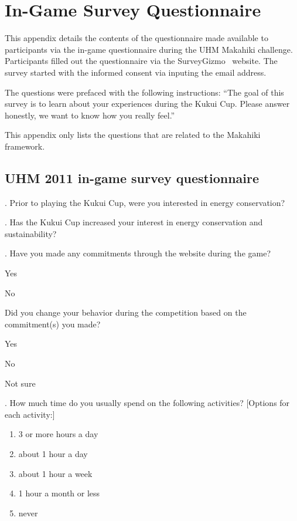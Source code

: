 \chapter{In-Game Survey Questionnaire}
\label{app:in-game-questionnaire}

This appendix details the contents of the questionnaire made available to participants via the in-game questionnaire during the UHM Makahiki challenge. Participants filled out the questionnaire via the SurveyGizmo~\cite{surveygizmo} website. The survey started with the informed consent via inputing  the email address. 

The questions were prefaced with the following instructions: ``The goal of this survey is to learn about your experiences during the Kukui Cup. Please answer honestly, we want to know how you really feel.''

This appendix only lists the questions that are related to the Makahiki framework.

\section {UHM 2011 in-game survey questionnaire}
. Prior to playing the Kukui Cup, were you interested in energy conservation?

. Has the Kukui Cup increased your interest in energy conservation and sustainability?

. Have you made any commitments through the website during the game?
\begin{radiobutton}
	\item Yes
	\item No
\end{radiobutton}

\noindent
[If Yes] Did you change your behavior during the competition based on the commitment(s) you made?
\begin{radiobutton}
	\item Yes
	\item No
	\item Not sure
\end{radiobutton}

. How much time do you usually spend on the following activities?
[Options for each activity:]
\begin{enumerate}
	\item 3 or more hours a day
	\item about 1 hour a day
	\item about 1 hour a week
	\item 1 hour a month or less
	\item never
\end{enumerate}


